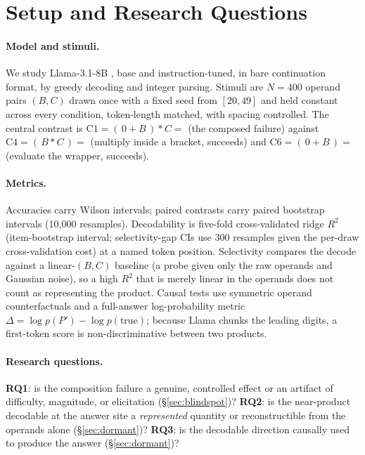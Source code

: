 \section{Setup and Research Questions}
\label{sec:setup}

\paragraph{Model and stimuli.}
We study Llama-3.1-8B \citep{grattafiori-etal-2024-llama}, base and instruction-tuned, in bare
continuation format, by greedy decoding and integer parsing. Stimuli are $N = 400$ operand pairs
$(B, C)$ drawn once with a fixed seed from $[20, 49]$ and held constant across every condition,
token-length matched, with spacing controlled. The central contrast is
$\text{C1} = (\,0 + B\,) * C =$ (the composed failure) against $\text{C4} = (\,B * C\,) =$
(multiply inside a bracket, succeeds) and $\text{C6} = (\,0 + B\,) =$ (evaluate the wrapper,
succeeds).

\paragraph{Metrics.}
Accuracies carry Wilson intervals; paired contrasts carry paired bootstrap intervals
(10{,}000 resamples). Decodability is five-fold cross-validated ridge $R^2$ (item-bootstrap
interval; selectivity-gap CIs use 300 resamples given the per-draw cross-validation cost) at a
named token position. Selectivity compares the decode against a linear-$(B,C)$
baseline (a probe given only the raw operands and Gaussian noise), so a high $R^2$ that is
merely linear in the operands does not count as representing the product. Causal tests use
symmetric operand counterfactuals and a full-answer log-probability metric
$\Delta = \log p(P') - \log p(\text{true})$; because Llama chunks the leading digits, a
first-token score is non-discriminative between two products.

\paragraph{Research questions.} \textbf{RQ1}: is the composition failure a genuine, controlled
effect or an artifact of difficulty, magnitude, or elicitation (\S\ref{sec:blindspot})?
\textbf{RQ2}: is the near-product decodable at the answer site a \emph{represented} quantity or
reconstructible from the operands alone (\S\ref{sec:dormant})? \textbf{RQ3}: is the decodable
direction causally used to produce the answer (\S\ref{sec:dormant})?
